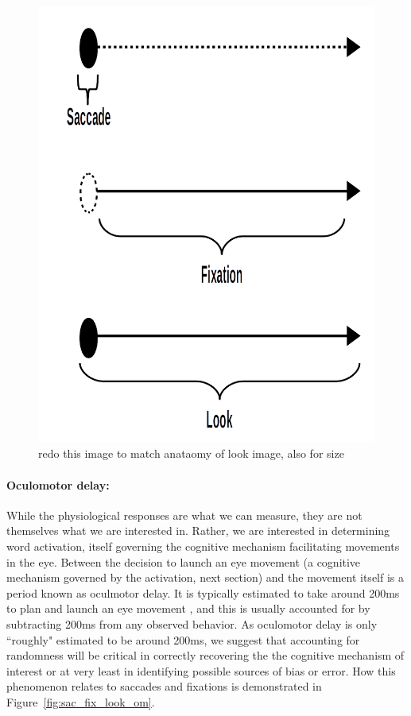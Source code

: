 \documentclass{article}
\begin{document}
\begin{figure}[H]
\centering
\includegraphics[scale=0.25]{sac_fix_look.png}
\caption{redo this image to match anataomy of look image, also for size}
\label{fig:sac_fix_look}
\end{figure}

\paragraph{Oculomotor delay:} While the physiological responses are what we can measure, they are not themselves what we are interested in. Rather, we are interested in determining word activation, itself governing the cognitive mechanism facilitating movements in the eye. Between the decision to launch an eye movement (a cognitive mechanism governed by the activation, next section) and the movement itself is a period known as oculmotor delay. It is typically estimated to take around 200ms to plan and launch an eye movement \cite{viviani1990time}, and this is usually accounted for by subtracting 200ms from any observed behavior. As oculomotor delay is only ``roughly" estimated to be around 200ms, we suggest that accounting for randomness will be critical in correctly recovering the the cognitive mechanism of interest or at very least in identifying possible sources of bias or error. How this phenomenon relates to saccades and fixations is demonstrated in Figure~\ref{fig:sac_fix_look_om}.
\end{document}
